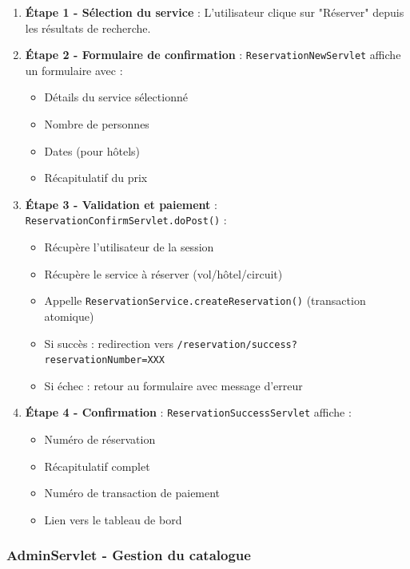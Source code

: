 \documentclass[12pt,a4paper]{report}
\begin{document}
\begin{enumerate}
    \item \textbf{Étape 1 - Sélection du service} : L'utilisateur clique sur "Réserver" depuis les résultats de recherche.
    
    \item \textbf{Étape 2 - Formulaire de confirmation} : \texttt{ReservationNewServlet} affiche un formulaire avec :
    \begin{itemize}
        \item Détails du service sélectionné
        \item Nombre de personnes
        \item Dates (pour hôtels)
        \item Récapitulatif du prix
    \end{itemize}
    
    \item \textbf{Étape 3 - Validation et paiement} : \texttt{ReservationConfirmServlet.doPost()} :
    \begin{itemize}
        \item Récupère l'utilisateur de la session
        \item Récupère le service à réserver (vol/hôtel/circuit)
        \item Appelle \texttt{ReservationService.createReservation()} (transaction atomique)
        \item Si succès : redirection vers \texttt{/reservation/success?reservationNumber=XXX}
        \item Si échec : retour au formulaire avec message d'erreur
    \end{itemize}
    
    \item \textbf{Étape 4 - Confirmation} : \texttt{ReservationSuccessServlet} affiche :
    \begin{itemize}
        \item Numéro de réservation
        \item Récapitulatif complet
        \item Numéro de transaction de paiement
        \item Lien vers le tableau de bord
    \end{itemize}
\end{enumerate}

\subsubsection{AdminServlet - Gestion du catalogue}
\end{document}
